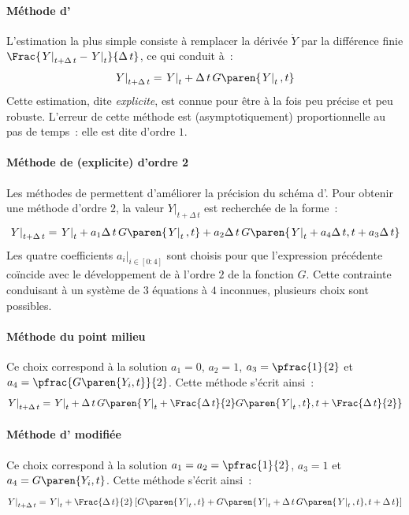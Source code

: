 \documentclass[rectoverso,pleiades,pstricks,leqno,anti]{texmf/note_technique_2010}
\newcommand{\debutpas}[1]{\ensuremath{\left.#1\right|_{t}}}
\newcommand{\finpas}[1]{\ensuremath{\left.#1\right|_{t+\Delta\, t}}}
\begin{document}
\paragraph{Méthode d'}
L'estimation la plus simple consiste à remplacer la dérivée
\(\dot{Y}\) par la différence finie
\(\Frac{\finpas{Y}-\debutpas{Y}}{\Delta\, t}\), ce qui conduit à~:
\begin{equation}
  \label{eq:explicite-implicite}
  \finpas{Y}=\debutpas{Y}+\Delta\,t\,G\paren{\debutpas{Y},t}
\end{equation}
Cette estimation, dite {\em explicite}, est connue pour être à la fois
peu précise et peu robuste. L'erreur de cette méthode est
(asymptotiquement) proportionnelle au pas de temps~: elle est dite
d'ordre \(1\).

\paragraph{Méthode de  (explicite) d'ordre 2}
Les méthodes de  permettent d'améliorer la précision
du schéma d'. Pour obtenir une méthode d'ordre \(2\), la
valeur \(\finpas{Y}\) est recherchée de la forme~:
\[
\finpas{Y} = \debutpas{Y}+a_{1}\Delta\,t\,G\paren{\debutpas{Y},t}+a_{2}\Delta\,t\,G\paren{\debutpas{Y}+a_{4}\Delta\, t,t+a_{3}\Delta\,t}
\]
Les quatre coefficients \(\left.a_{i}\right|_{i \in [0:4]}\) sont
choisis pour que l'expression précédente coïncide avec le
développement de  à l'ordre \(2\) de la fonction \(G\).
Cette contrainte conduisant à un système de \(3\) équations à \(4\)
inconnues, plusieurs choix sont possibles.

\paragraph{Méthode du point milieu} Ce choix correspond à la solution
\(a_{1}=0\), \(a_{2}=1\), \(a_{3}=\pfrac{1}{2}\) et
\(a_{4}=\pfrac{G\paren{Y_{i},t}}{2}\). Cette méthode s'écrit ainsi~:
\[
\finpas{Y} = \debutpas{Y}+\Delta\,t\,G\paren{\debutpas{Y}+\Frac{\Delta\, t}{2}G\paren{\debutpas{Y},t},t+\Frac{\Delta\, t}{2}}
\]

\paragraph{Méthode d' modifiée} Ce choix correspond à la solution
\(a_{1}=a_{2}=\pfrac{1}{2}\), \(a_{3}=1\) et
\(a_{4}=G\paren{Y_{i},t}\). Cette méthode s'écrit ainsi~:
\[
\finpas{Y} = \debutpas{Y}+\Frac{\Delta\,t}{2}\left[G\paren{\debutpas{Y},t}+G\paren{\debutpas{Y}+\Delta\, t\,G\paren{\debutpas{Y},t},t+\Delta\,t }\right]
\]
\end{document}

